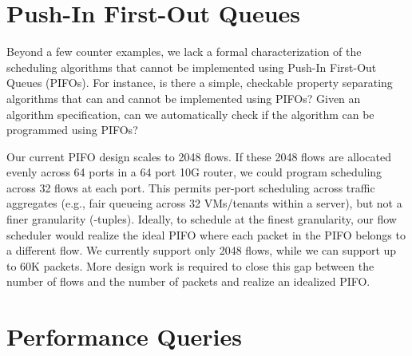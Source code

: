 \section{Push-In First-Out Queues}
\label{sec:pifo_limitations}

Beyond a few counter examples, we lack a formal characterization of the
scheduling algorithms that cannot be implemented using Push-In First-Out Queues
(PIFOs). For instance, is there a simple, checkable property separating
algorithms that can and cannot be implemented using PIFOs? Given an algorithm
specification, can we automatically check if the algorithm can be programmed
using PIFOs?

Our current PIFO design scales to 2048 flows. If these 2048 flows are allocated
evenly across 64 ports in a 64 port 10G router, we could program scheduling
across 32 flows at each port. This permits per-port scheduling across traffic
aggregates (e.g., fair queueing across 32 VMs/tenants within a server), but not
a finer granularity (-tuples). Ideally, to schedule at the finest
granularity, our flow scheduler would realize the ideal PIFO where each packet
in the PIFO belongs to a different flow. We currently support only 2048 flows,
while we can support up to 60K packets.  More design work is required to close
this gap between the number of flows and the number of packets and realize an
idealized PIFO.



\section{Performance Queries}
\label{sec:pq_limitations}

